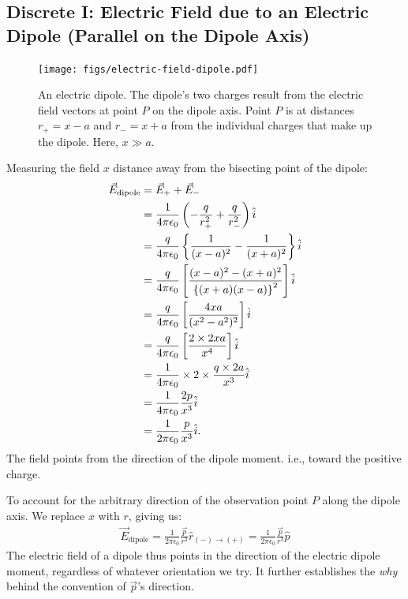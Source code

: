 \documentclass[12pt,b4paper]{article}
\begin{document}
\subsection{Discrete I: Electric Field due to an Electric Dipole (Parallel on the Dipole Axis)}
\begin{figure}[H]
    \centering
    \texttt{[image: figs/electric-field-dipole.pdf]}
    \caption{An electric dipole. The dipole's two charges result from the electric field vectors at point $P$ on the dipole axis. Point $P$ is at distances $r_+=x-a$ and $r_-=x+a$ from the individual charges that make up the dipole. Here, $x\gg a$.}
    \label{fig:electric-field-dipole}
\end{figure}
Measuring the field $x$ distance away from the bisecting point of the dipole:
\begin{align}
    \vec{E}_\text{dipole}&=\vec{E}_++\vec{E}_-\notag\\
    &=\frac{1}{4\pi\epsilon_0}\left(-\frac{q}{r_+^2}+\frac{q}{r_-^2}\right)\hat{i}\notag\\
    &=\frac{q}{4\pi\epsilon_0}\left\{\frac{1}{(x-a)^2}-\frac{1}{(x+a)^2}\right\}\hat{i}\notag\\
    &=\frac{q}{4\pi\epsilon_0}\left[\frac{(x-a)^2-(x+a)^2}{\left\{(x+a)(x-a)\right\}^2}\right]\hat{i}\notag\\
    &=\frac{q}{4\pi\epsilon_0}\left[\frac{4xa}{(x^2-a^2)^2}\right]\hat{i}\notag\\
    &=\frac{q}{4\pi\epsilon_0}\left[\frac{2\times2xa}{x^4}\right]\hat{i}\notag\\
    &=\frac{1}{4\pi\epsilon_0}\times2\times\frac{q\times 2a}{x^3}\hat{i}\notag\\
    &=\frac{1}{4\pi\epsilon_0}\frac{2{p}}{x^3}\hat{i}\notag\\
    &=\frac{1}{2\pi\epsilon_0}\frac{{p}}{x^3}\hat{i}.
\end{align}
The field points from the direction of the dipole moment. i.e., toward the positive charge.

To account for the arbitrary direction of the observation point $P$ along the dipole axis. We replace $x$ with $r$, giving us:
\begin{align}
    \vec{E}_\text{dipole}=\frac{1}{2\pi\epsilon_0}\frac{\vec{p}}{r^3}\hat{r}_{(-)\to(+)}=\frac{1}{2\pi\epsilon_0}\frac{\vec{p}}{r^3}\hat{p}\label{eq:field-on-the-dipole-axis}
\end{align}
The electric field of a dipole thus points in the direction of the electric dipole moment, regardless of whatever orientation we try. It further establishes the \textit{why} behind the convention of $\vec{p}$'s direction.
\end{document}
